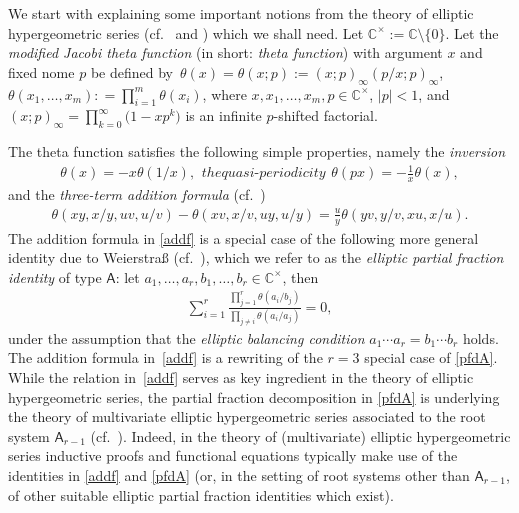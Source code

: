 \documentclass[pdftex]{sigma}
\numberwithin{equation}{section}
\theoremstyle{definition}
\newcommand{\ta}{\theta}
\newcommand{\C}{\mathbb C}
\begin{document}
We start with explaining some important notions from the
theory of elliptic hypergeometric series (cf.\ \cite[Chapter~11]{GR}
and \cite{R21}) which we shall need.
Let $\C^\times:=\C\setminus\{0\}$. Let the \textit{modified
Jacobi theta function} (in short: \textit{theta function}) with
argument $x$ and fixed nome $p$ be defined by~${
\ta(x)=\ta (x; p):= (x; p)_\infty (p/x; p)_\infty}$, $
\ta (x_1, \dots, x_m): = \prod^m_{i=1} \ta (x_i)$,
where $ x, x_1, \dots, x_m, p\in \C^\times$, ${|p| < 1}$, and
$(x; p)_\infty=\prod^\infty_{k=0}\bigl(1-x p^k\bigr)$ is an infinite
$p$-shifted factorial.

The theta function satisfies the following simple properties,
namely the \textit{inversion}
\begin{subequations}
\begin{gather}\label{eq:inv}
\ta(x)=-x \ta(1/x),
\end{gather}
the \textit{quasi-periodicity}
\begin{gather}\label{p1id}
\ta(px)=-\frac 1x \ta(x),
\end{gather}
\end{subequations}
and the \textit{three-term addition formula}
(cf.\ \cite[p.~451, Example 5]{WW})
\begin{gather}\label{addf}
\ta(xy,x/y,uv,u/v)-\ta(xv,x/v,uy,u/y)
=\frac uy \ta(yv,y/v,xu,x/u).
\end{gather}
The addition formula in \eqref{addf} is a special case of the
following more general identity due to Weierstra{\ss}
(cf.\ \cite[p.~451, Example 3]{WW}),
which we refer to as the \textit{elliptic partial fraction identity}
of type $\mathsf A$:
let $a_1,\dots,a_r,b_1,\dots,b_r\in\C^\times$, then
\begin{gather}\label{pfdA}
\sum_{i=1}^r\frac{\prod_{j=1}^r\ta(a_i/b_j)}{\prod_{j\neq i}\ta(a_i/a_j)}=0,
\end{gather}
under the assumption that the \textit{elliptic balancing condition}
$a_1\cdots a_r=b_1\cdots b_r$ holds.
The addition formula in~\eqref{addf} is a rewriting of the $r=3$
special case of \eqref{pfdA}. While the relation in~\eqref{addf}
serves as key ingredient in the theory of elliptic hypergeometric
series, the partial fraction decomposition in \eqref{pfdA}
is underlying the theory of multivariate elliptic hypergeometric
series associated to the root system $\mathsf A_{r-1}$
(cf.\ \cite{R04,RW}). Indeed, in the theory of (multivariate)
elliptic hypergeometric series inductive proofs and functional
equations typically make use of the identities in \eqref{addf}
and \eqref{pfdA}
(or, in the setting of root systems other than $\mathsf A_{r-1}$,
of other suitable elliptic partial fraction identities which exist).
\end{document}
